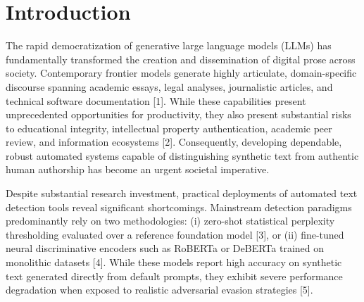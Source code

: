 \documentclass[conference]{IEEEtran}
\begin{document}
\section{Introduction}
The rapid democratization of generative large language models (LLMs) has fundamentally transformed the creation and dissemination of digital prose across society. Contemporary frontier models generate highly articulate, domain-specific discourse spanning academic essays, legal analyses, journalistic articles, and technical software documentation [1]. While these capabilities present unprecedented opportunities for productivity, they also present substantial risks to educational integrity, intellectual property authentication, academic peer review, and information ecosystems [2]. Consequently, developing dependable, robust automated systems capable of distinguishing synthetic text from authentic human authorship has become an urgent societal imperative.

Despite substantial research investment, practical deployments of automated text detection tools reveal significant shortcomings. Mainstream detection paradigms predominantly rely on two methodologies: (i) zero-shot statistical perplexity thresholding evaluated over a reference foundation model [3], or (ii) fine-tuned neural discriminative encoders such as RoBERTa or DeBERTa trained on monolithic datasets [4]. While these models report high accuracy on synthetic text generated directly from default prompts, they exhibit severe performance degradation when exposed to realistic adversarial evasion strategies [5].
\end{document}
